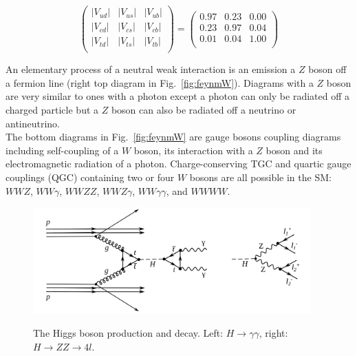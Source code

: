 \begin{equation}\label{eq:CKM_magn}
  \begin{pmatrix} 
     |V_{ud}| & |V_{us}| & |V_{ub}| \\
     |V_{cd}| & |V_{cs}| & |V_{cb}| \\
     |V_{td}| & |V_{ts}| & |V_{tb}| \\ 
  \end{pmatrix}
    =
  \begin{pmatrix} 
     0.97 & 0.23 & 0.00 \\
     0.23 & 0.97 & 0.04 \\
     0.01 & 0.04 & 1.00 \\ 
  \end{pmatrix}
\end{equation}

An elementary process of a neutral weak interaction is an emission a $Z$ boson off a fermion line (right top diagram in Fig.~\ref{fig:feynmW}). Diagrams with a $Z$ boson are very similar to ones with a photon except a photon can only be radiated off a charged particle but a $Z$ boson can also be radiated off a neutrino or antineutrino.\\

The bottom diagrams in Fig.~\ref{fig:feynmW} are gauge bosons coupling diagrams including self-coupling of a $W$ boson, its interaction with a $Z$ boson and its electromagnetic radiation of a photon. Charge-conserving TGC and quartic gauge couplings (QGC) containing two or four $W$ bosons are all possible in the SM: $WWZ$, $WW\gamma$, $WWZZ$, $WWZ\gamma$, $WW\gamma\gamma$, and $WWWW$.\\

\begin{figure}[htb]
  \begin{center}
    {\includegraphics[width=0.95\textwidth]{../figs/Intro/FeynmanHiggs.png}}
    \caption{The Higgs boson production and decay. Left: $H\rightarrow\gamma\gamma$, right: $H\rightarrow ZZ \rightarrow 4l$.}
    \label{fig:higgsProduction}
  \end{center}
\end{figure}

